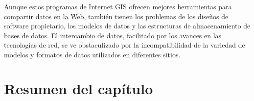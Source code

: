 Aunque estos programas de Internet GIS ofrecen mejores herramientas para compartir datos en la Web, también tienen los problemas de los diseños de software propietario, los modelos de datos y las estructuras de almacenamiento de bases de datos. El intercambio de datos, facilitado por los avances en las tecnologías de red, se ve obstaculizado por la incompatibilidad de la variedad de modelos y formatos de datos utilizados en diferentes sitios.


\section{Resumen del capítulo}

